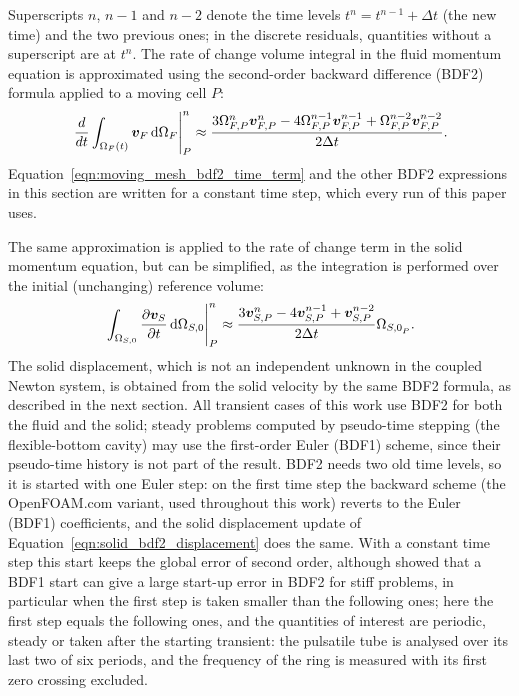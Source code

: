 Superscripts $n$, $n-1$ and $n-2$ denote the time levels $t^n = t^{n-1} + \Delta t$ (the new time) and the two previous ones; in the discrete residuals, quantities without a superscript are at $t^n$.
The rate of change volume integral in the fluid momentum equation is approximated using the second-order backward difference (BDF2) formula applied to a moving cell $P$:
\begin{equation}
    \left.
    \frac{d}{dt}
    \int_{\Omega_F(t)}
    \boldsymbol{v}_F
    \, \text{d}\Omega_F
    \right|_P^n
    \approx
    \frac{
    3 \Omega_{F,P}^{n} \boldsymbol{v}_{F,P}^{n}
    -
    4 \Omega_{F,P}^{n-1} \boldsymbol{v}_{F,P}^{n-1}
    +
    \Omega_{F,P}^{n-2} \boldsymbol{v}_{F,P}^{n-2}
    }
    {2\Delta t}.
    \label{eqn:moving_mesh_bdf2_time_term}
\end{equation}
Equation~\eqref{eqn:moving_mesh_bdf2_time_term} and the other BDF2 expressions in this section are written for a constant time step, which every run of this paper uses.

The same approximation is applied to the rate of change term in the solid momentum equation, but can be simplified, as the integration is performed over the initial (unchanging) reference volume:
\begin{equation}
    \left.
    \int_{\Omega_{S,0}}
    \frac{\partial \boldsymbol{v}_S}{\partial t}
    \, \text{d}\Omega_{S,0}
    \right|^{n}_P
    \approx
    \frac{
    3\boldsymbol{v}^{n}_{S,P}
    -
    4\boldsymbol{v}^{n-1}_{S,P}
    +
    \boldsymbol{v}^{n-2}_{S,P}
    }
    {2\Delta t}
    \Omega_{{S,0}_P}.
    \label{eqn:bdf2}
\end{equation}
The solid displacement, which is not an independent unknown in the coupled Newton system, is obtained from the solid velocity by the same BDF2 formula, as described in the next section.
All transient cases of this work use BDF2 for both the fluid and the solid; steady problems computed by pseudo-time stepping (the flexible-bottom cavity) may use the first-order Euler (BDF1) scheme, since their pseudo-time history is not part of the result.
BDF2 needs two old time levels, so it is started with one Euler step: on the first time step the backward scheme (the OpenFOAM.com variant, used throughout this work) reverts to the Euler (BDF1) coefficients, and the solid displacement update of Equation~\eqref{eqn:solid_bdf2_displacement} does the same.
With a constant time step this start keeps the global error of second order, although \citet{Nishikawa2019bdf2} showed that a BDF1 start can give a large start-up error in BDF2 for stiff problems, in particular when the first step is taken smaller than the following ones; here the first step equals the following ones, and the quantities of interest are periodic, steady or taken after the starting transient: the pulsatile tube is analysed over its last two of six periods, and the frequency of the ring is measured with its first zero crossing excluded.

